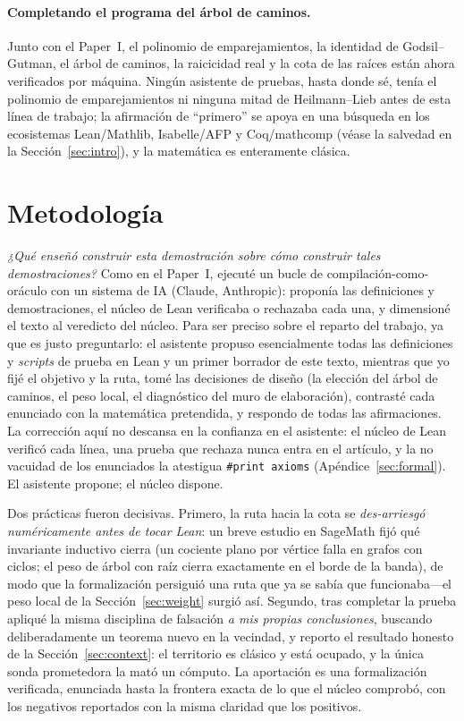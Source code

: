 \documentclass[11pt]{article}
\newcommand{\lean}[1]{{\def\_{\textunderscore\allowbreak}\texttt{#1}}}
\begin{document}
\paragraph{Completando el programa del \'arbol de caminos.} Junto con el Paper~I, el
polinomio de emparejamientos, la identidad de Godsil--Gutman, el \'arbol de caminos,
la raicicidad real y la cota de las ra\'ices est\'an ahora verificados por m\'aquina.
Ning\'un asistente de pruebas, hasta donde s\'e, ten\'ia el polinomio de
emparejamientos ni ninguna mitad de Heilmann--Lieb antes de esta l\'inea de trabajo;
la afirmaci\'on de ``primero'' se apoya en una b\'usqueda en los ecosistemas
Lean/Mathlib, Isabelle/AFP y Coq/mathcomp (v\'ease la salvedad en la
Secci\'on~\ref{sec:intro}), y la matem\'atica es enteramente cl\'asica.

\section{Metodolog\'ia}
\label{sec:method}

\emph{¿Qu\'e ense\~n\'o construir esta demostraci\'on sobre c\'omo construir tales
demostraciones?} Como en el Paper~I, ejecut\'e un bucle de compilaci\'on-como-or\'aculo
con un sistema de IA (Claude, Anthropic): propon\'ia las definiciones y
demostraciones, el n\'ucleo de Lean verificaba o rechazaba cada una, y dimension\'e
el texto al veredicto del n\'ucleo. Para ser preciso sobre el reparto del trabajo,
ya que es justo preguntarlo: el asistente propuso esencialmente todas las
definiciones y \emph{scripts} de prueba en Lean y un primer borrador de este texto,
mientras que yo fij\'e el objetivo y la ruta, tom\'e las decisiones de dise\~no (la
elecci\'on del \'arbol de caminos, el peso local, el diagn\'ostico del muro de
elaboraci\'on), contrast\'e cada enunciado con la matem\'atica pretendida, y
respondo de todas las afirmaciones. La correcci\'on aqu\'i no descansa en la
confianza en el asistente: el n\'ucleo de Lean verific\'o cada l\'inea, una prueba
que rechaza nunca entra en el art\'iculo, y la no vacuidad de los enunciados la
atestigua \lean{\#print axioms} (Ap\'endice~\ref{sec:formal}). El asistente propone;
el n\'ucleo dispone.

Dos pr\'acticas fueron decisivas. Primero, la ruta hacia la cota se
\emph{des-arriesg\'o num\'ericamente antes de tocar Lean}: un breve estudio en
SageMath fij\'o qu\'e invariante inductivo cierra (un cociente plano por v\'ertice
falla en grafos con ciclos; el peso de \'arbol con raíz cierra exactamente en el
borde de la banda), de modo que la formalizaci\'on persigui\'o una ruta que ya se
sab\'ia que funcionaba---el peso local de la Secci\'on~\ref{sec:weight} surgi\'o
as\'i. Segundo, tras completar la prueba apliqu\'e la misma disciplina de
falsaci\'on \emph{a mis propias conclusiones}, buscando deliberadamente un teorema
nuevo en la vecindad, y reporto el resultado honesto de la
Secci\'on~\ref{sec:context}: el territorio es cl\'asico y est\'a ocupado, y la
\'unica sonda prometedora la mat\'o un c\'omputo. La aportaci\'on es una
formalizaci\'on verificada, enunciada hasta la frontera exacta de lo que el n\'ucleo
comprob\'o, con los negativos reportados con la misma claridad que los positivos.
\end{document}

